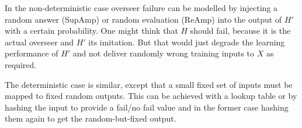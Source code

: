 \documentclass{farlamp}
\begin{document}
In the non-deterministic case overseer failure can be modelled by injecting a
random answer (SupAmp) or random evaluation (ReAmp) into the output of $H'$ with
a certain probability. One might think that $H$ should fail, because it is the
actual overseer and $H'$ its imitation. But that would just degrade the learning
performance of $H'$ and not deliver randomly wrong training inputs to $X$ as
required.

The deterministic case is similar, except that a small fixed set of inputs must
be mapped to fixed random outputs. This can be achieved with a lookup table or
by hashing the input to provide a fail/no fail value and in the former case
hashing them again to get the random-but-fixed output.


\printbibliography
\end{document}
